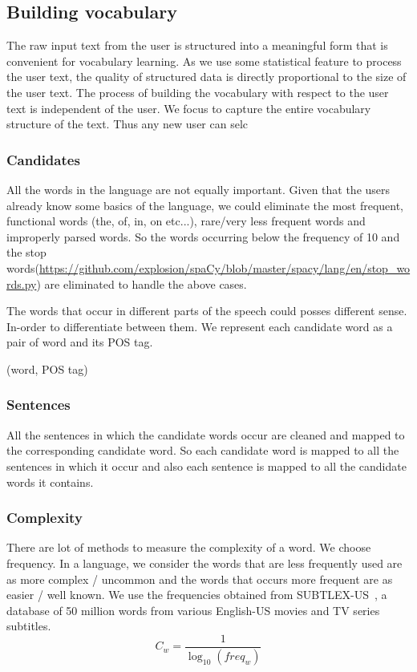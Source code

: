 \documentclass[11pt,a4paper]{article}
\begin{document}
\subsection{Building vocabulary}
The raw input text from the user is structured into a meaningful form that is
convenient for vocabulary learning. As we use some statistical feature to
process the user text, the quality of structured data is directly
proportional to the size of the user text. The process of building the
vocabulary with respect to the user text is independent of the user. We focus
to capture the entire vocabulary structure of the text. Thus any new user can
selc

\subsubsection{Candidates}
All the words in the language are not equally important. Given that the users
already know some basics of the language, we could eliminate the most frequent, 
functional words (the, of, in, on etc...), rare/very less frequent words and
improperly parsed words. So the words occurring below the frequency of 10 and
the stop words(\url{https://github.com/explosion/spaCy/blob/master/spacy/lang/en/stop_words.py}) are eliminated to handle the above cases. 

The words that occur in different parts of the speech could posses different sense.
In-order to differentiate between them. We represent each candidate word as a
pair of word and its POS tag.
\begin{center}(word, POS tag)\end{center}

\subsubsection{Sentences}
All the sentences in which the candidate words occur are cleaned and mapped to
the corresponding candidate word. So each candidate word is mapped to all the sentences
in which it occur and also each sentence is mapped to all the candidate
words it contains.

\subsubsection{Complexity}
There are lot of methods to measure the complexity of a word. We choose frequency.
In a language, we consider the words that are less frequently used are as
more complex / uncommon and the words that occurs more frequent are as easier / well known.
We use the frequencies obtained from SUBTLEX-US~\citet{brysbaert2009moving}, a database of 50 million
words from various English-US movies and TV series subtitles.
\begin{equation}
  C_w = \frac{1}{\log_{10}(freq_w)}
\end{equation}
\end{document}

